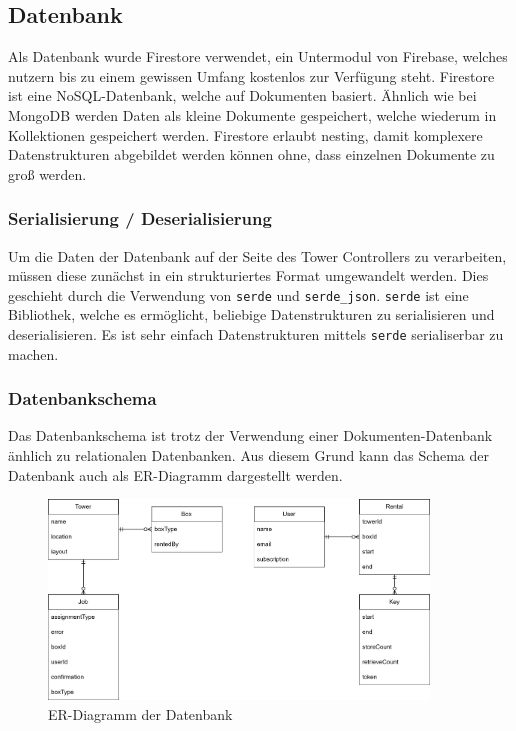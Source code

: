 \subsection{Datenbank}

Als Datenbank wurde Firestore verwendet, ein Untermodul von Firebase, welches nutzern bis zu einem gewissen Umfang kostenlos zur Verfügung steht. Firestore ist eine NoSQL-Datenbank, welche auf Dokumenten basiert. Ähnlich wie bei MongoDB werden Daten als kleine Dokumente gespeichert, welche wiederum in Kollektionen gespeichert werden. Firestore erlaubt nesting, damit komplexere Datenstrukturen abgebildet werden können ohne, dass einzelnen Dokumente zu groß werden.


\subsubsection{Serialisierung / Deserialisierung}

Um die Daten der Datenbank auf der Seite des Tower Controllers zu verarbeiten, müssen diese zunächst in ein strukturiertes Format umgewandelt werden. Dies geschieht durch die Verwendung von \texttt{serde} und \texttt{serde\_json}. \texttt{serde} ist eine Bibliothek, welche es ermöglicht, beliebige Datenstrukturen zu serialisieren und deserialisieren. Es ist sehr einfach Datenstrukturen mittels \texttt{serde} serialiserbar zu machen.


\subsubsection{Datenbankschema}
Das Datenbankschema ist trotz der Verwendung einer Dokumenten-Datenbank änhlich zu relationalen Datenbanken. Aus diesem Grund kann das Schema der Datenbank auch als ER-Diagramm dargestellt werden.

\begin{figure}[H]
    \centering
    \includegraphics[width=0.9\textwidth]{images/datenbankstruktur.png}
    \caption{ER-Diagramm der Datenbank}
    \label{fig:er_diagramm}
\end{figure}

